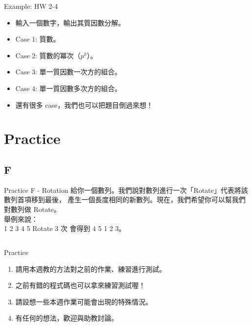 \documentclass[t]{beamer}
\begin{document}
\begin{frame}{Example: HW 2-4}
  \begin{itemize}
    \item 輸入一個數字，輸出其質因數分解。
    \item Case 1: 質數。
    \item Case 2: 質數的冪次（$p^k$）。
    \item Case 3: 單一質因數一次方的組合。
    \item Case 4: 單一質因數多次方的組合。
    \item 還有很多 case，我們也可以把題目倒過來想！
  \end{itemize}
\end{frame}

\section{Practice}
\subsection{F}
\begin{frame}{Practice F - Rotation}
  給你一個數列。我們說對數列進行一次「Rotate」代表將該數列首項移到最後，
  產生一個長度相同的新數列。現在，我們希望你可以幫我們對數列做 Rotate。\\
  \vspace{2em}
  舉例來說：\\
  1 2 3 4 5 Rotate 3 次 會得到 4 5 1 2 3。
\end{frame}

\subsection{}
\begin{frame}{Practice}
  \begin{enumerate}
    \item 請用本週教的方法對之前的作業、練習進行測試。
    \item 之前有錯的程式碼也可以拿來練習測試喔！
    \item 請設想一些本週作業可能會出現的特殊情況。
    \item 有任何的想法，歡迎與助教討論。
  \end{enumerate}
\end{frame}

\end{document}
